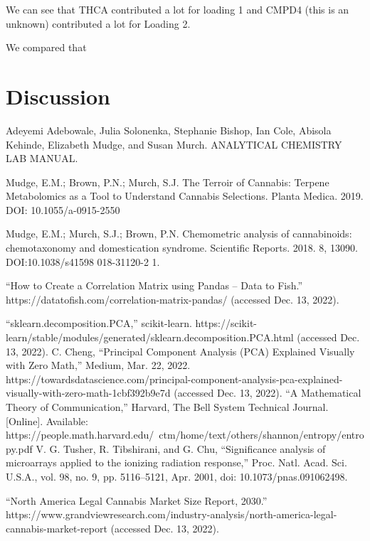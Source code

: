 \documentclass{article}
\begin{document}
\raggedright


We can see that THCA contributed a lot for loading 1 and CMPD4 (this is an unknown) contributed a lot for Loading 2. 

We compared that 

\section{Discussion}

\begin{thebibliography}{9}
Adeyemi Adebowale, Julia Solonenka, Stephanie Bishop, Ian Cole, Abisola Kehinde, Elizabeth Mudge, and Susan Murch. ANALYTICAL  CHEMISTRY  LAB MANUAL.

Mudge, E.M.; Brown, P.N.; Murch, S.J. The Terroir of Cannabis: Terpene Metabolomics as a Tool
 to Understand Cannabis Selections. Planta Medica. 2019. DOI: 10.1055/a-0915-2550

Mudge, E.M.; Murch, S.J.; Brown, P.N. Chemometric analysis of cannabinoids: chemotaxonomy
 and domestication syndrome. Scientific Reports. 2018. 8, 13090. DOI:10.1038/s41598
 018-31120-2 1. 

“How to Create a Correlation Matrix using Pandas – Data to Fish.” https://datatofish.com/correlation-matrix-pandas/ (accessed Dec. 13, 2022).

“sklearn.decomposition.PCA,” scikit-learn. https://scikit-learn/stable/modules/generated/sklearn.decomposition.PCA.html (accessed Dec. 13, 2022).
C. Cheng, “Principal Component Analysis (PCA) Explained Visually with Zero Math,” Medium, Mar. 22, 2022. https://towardsdatascience.com/principal-component-analysis-pca-explained-visually-with-zero-math-1cbf392b9e7d (accessed Dec. 13, 2022).
“A Mathematical Theory of Communication,” Harvard, The Bell System Technical Journal. [Online]. Available: https://people.math.harvard.edu/~ctm/home/text/others/shannon/entropy/entropy.pdf
V. G. Tusher, R. Tibshirani, and G. Chu, “Significance analysis of microarrays applied to the ionizing radiation response,” Proc. Natl. Acad. Sci. U.S.A., vol. 98, no. 9, pp. 5116–5121, Apr. 2001, doi: 10.1073/pnas.091062498.


“North America Legal Cannabis Market Size Report, 2030.” https://www.grandviewresearch.com/industry-analysis/north-america-legal-cannabis-market-report (accessed Dec. 13, 2022).

\end{thebibliography}
\end{document}
